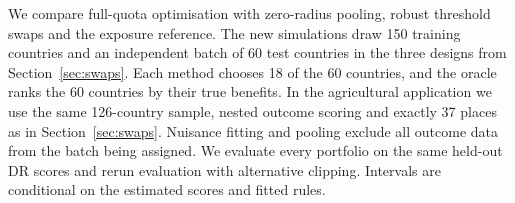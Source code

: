 We compare full-quota optimisation with zero-radius pooling, robust threshold
swaps and the exposure reference. The new simulations draw 150 training
countries and an independent batch of 60 test countries in the three designs
from Section~\ref{sec:swaps}. Each method chooses 18 of the 60 countries,
and the oracle ranks the 60 countries by their true benefits. In the agricultural
application we use the same 126-country sample, nested outcome scoring and
exactly 37 places as in Section~\ref{sec:swaps}. Nuisance fitting and pooling
exclude all outcome data from the batch being assigned. We evaluate every
portfolio on the same held-out DR scores and rerun evaluation with alternative
clipping. Intervals are conditional on the estimated scores and fitted rules.
